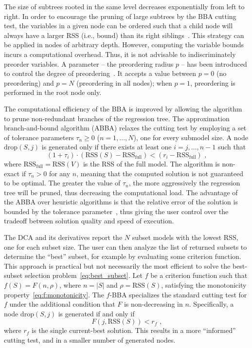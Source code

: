 \documentclass[article]{jss}
\newcommand{\qq}[1]{``{#1}''}
\newcommand{\drop}{\mathrm{drop}}
\newcommand{\rss}{\mathrm{RSS}}
\newcommand{\card}[1]{\left\lvert{#1}\right\rvert}
\begin{document}
The size of subtrees rooted in the same level decreases exponentially
from left to right.  In order to encourage the pruning of large
subtrees by the BBA cutting test, the variables in a given node can be
ordered such that a child node will always have a larger RSS (i.e.,
bound) than its right siblings~\citep{gatu:j_comput_graph_stat:06}.
This strategy can be applied in nodes of arbitrary depth.  However,
computing the variable bounds incurs a computational overhead.  Thus,
it is not advisable to indiscriminately preorder variables.  A
parameter -- the preordering radius $p$ -- has been introduced to
control the degree of
preordering~\citep{hofmann:comput_stat_data_an:07}.  It accepts a
value between $p=0$ (no preordering) and $p=N$ (preordering in all
nodes); when $p=1$, preordering is performed in the root node only.

The computational efficiency of the BBA is improved by allowing the
algorithm to prune non-redundant branches of the regression tree.  The
approximation branch-and-bound algorithm (ABBA) relaxes the cutting
test by employing a set of tolerance parameters $\tau_n\ge 0$
($n=1,\ldots,N$), one for every submodel size.  A node $\drop(S,j)$ is
generated only if there exists at least one $i=j,\ldots,n-1$ such that
%
\begin{equation}
  \label{eq:abba}
  (1+\tau_i)\cdot(\rss(S)-\rss_{\text{full}})<(r_i-\rss_{\text{full}})\text{ ,}
\end{equation}
%
where $\rss_{\text{full}}=\rss(V)$ is the RSS of the full model.  The
algorithm is non-exact if $\tau_n>0$ for any $n$, meaning that the
computed solution is not guaranteed to be optimal.  The greater the
value of $\tau_n$, the more aggressively the regression tree will be
pruned, thus decreasing the computational load.  The advantage of the
ABBA over heuristic algorithms is that the relative error of the
solution is bounded by the tolerance
parameter~\citep{gatu:j_comput_graph_stat:06,hofmann:comput_stat_data_an:07},
thus giving the user control over the tradeoff between solution
quality and speed of execution.

The DCA and its derivatives report the $N$ subset models with the
lowest RSS, one for each subset size.  The user can then analyze the
list of returned subsets to determine the \qq{best} subset, for
example by evaluating some criterion function.  This approach is
practical but not necessarily the most efficient to solve the
best-subset selection problem~\eqref{eq:best_subset}.  Let $f$ be a
criterion function such that $f(S)=F(n,\rho)$, where $n=\card{S}$ and
$\rho=\rss(S)$, satisfying the monotonicity
property~\eqref{eq:f:monotonicity}.  The $f$-BBA specializes the
standard cutting test for $f$ under the additional condition that $F$
is non-decreasing in $n$.  Specifically, a node $\drop(S,j)$ is
generated if and only if
%
\begin{equation}
  \label{eq:bba+}
  F(j,\rss(S))<r_f\text{ ,}
\end{equation}
%
where $r_f$ is the single current-best solution.  This results in a
more \qq{informed} cutting test, and in a smaller number of generated
nodes.
\end{document}
